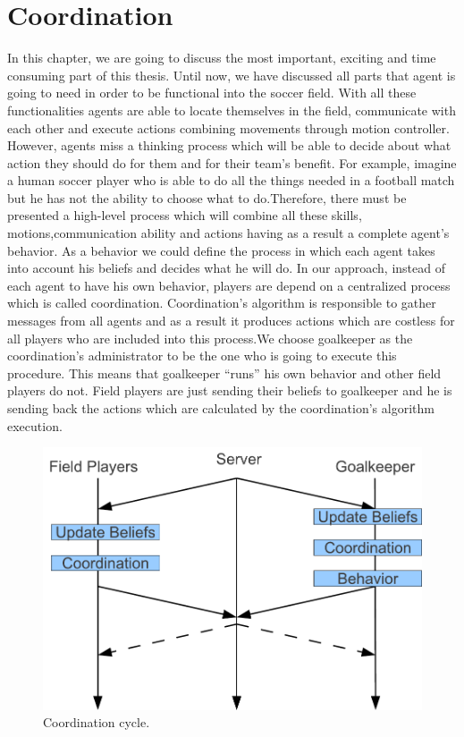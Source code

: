 \chapter{Coordination}
\label{Coordination}
In this chapter, we are going to discuss the most important, exciting and time consuming part of this thesis.
Until now, we have discussed all parts that agent is going to need in order to be functional into the soccer field.
With all these functionalities agents are able to locate themselves in the field, communicate with each other and execute
actions combining movements through motion controller. However, agents miss a thinking process which will be able to decide about what action they should do for them and for their team's benefit. For example, imagine a human soccer player who is able to do all the things needed in a football match but he has not the ability to choose what to do.Therefore, there must be presented a high-level process which will combine all these skills, motions,communication ability and actions having as a result a complete agent's behavior. As a behavior we could define the process in which each agent takes into account his beliefs and decides what he will do. In our approach, instead of each agent to have his own behavior, players are depend on a centralized process which is called coordination.  Coordination's algorithm is responsible to gather messages from all agents and as a result it produces actions which are costless for all players who are included into this process.We choose goalkeeper as the coordination's administrator to be the one who is going to execute this procedure. This means that goalkeeper ``runs'' his own behavior and other field players do not. Field players are just sending their beliefs to goalkeeper and he is sending back the actions which are calculated by the coordination's algorithm execution. 
\begin{figure}[htb!]
\centering
  \includegraphics[scale=0.6]{Chapter4/figures/CoordinationCycle.pdf}
  \caption{Coordination cycle.} 
  \label{fig:CoordinationCycle}
\end{figure}
